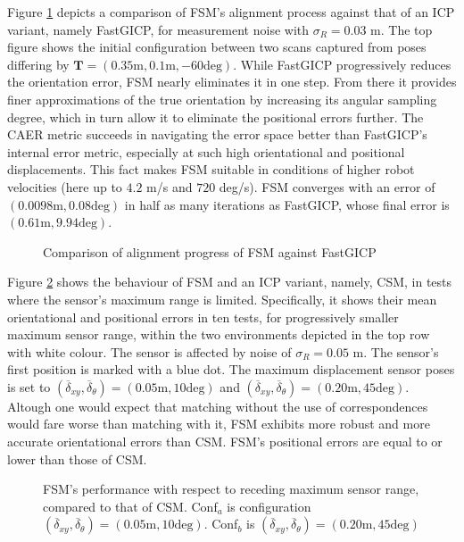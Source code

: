 Figure \ref{fig:char_fsm_vs_FGI} depicts a comparison of FSM's alignment
process against that of an ICP variant, namely FastGICP, for measurement noise
with $\sigma_R = 0.03$ m. The top figure shows the initial configuration
between two scans captured from poses differing by $\bm{T} = (0.35 \text{m},
0.1 \text{m}, -60 \text{deg})$. While FastGICP progressively reduces the
orientation error, FSM nearly eliminates it in one step. From there it provides
finer approximations of the true orientation by increasing its angular sampling
degree, which in turn allow it to eliminate the positional errors further. The
CAER metric succeeds in navigating the error space better than FastGICP's
internal error metric, especially at such high orientational and positional
displacements. This fact makes FSM suitable in conditions of higher robot
velocities (here up to $4.2$ m/s and $720$ deg/s). FSM converges with an error
of $(0.0098 \text{m}, 0.08 \text{deg})$ in half as many iterations as FastGICP,
whose final error is $(0.61 \text{m}, 9.94 \text{deg})$.

\begin{figure}
    \vspace{0.2cm}
    
    \caption{\small Comparison of alignment progress of FSM against FastGICP}%
    \label{fig:char_fsm_vs_FGI}%
\end{figure}

Figure \ref{fig:char_max_range_test} shows the behaviour of FSM and an ICP
variant, namely, CSM, in tests where the sensor's maximum range is limited.
Specifically, it shows their mean orientational and positional errors in ten
tests, for progressively smaller maximum sensor range, within the two
environments depicted in the top row with white colour. The sensor is affected
by noise of $\sigma_R = 0.05$ m. The sensor's first position is marked with a
blue dot. The maximum displacement sensor poses is set to
$(\overline{\delta}_{xy}, \overline{\delta}_{\theta}) = (0.05 \text{m}, 10 \text{deg})$
and
$(\overline{\delta}_{xy}, \overline{\delta}_{\theta}) = (0.20 \text{m}, 45 \text{deg})$.
Altough one would expect that matching without the use of correspondences would
fare worse than matching with it, FSM exhibits more robust and more accurate
orientational errors than CSM. FSM's positional errors are equal to or lower
than those of CSM.


\begin{figure}\centering
\vspace{-0.2cm}
    
    \vspace{-2.0cm}
    \caption{\small FSM's performance with respect to receding maximum sensor
             range, compared to that of CSM. Conf$_a$ is configuration
             $(\overline{\delta}_{xy}, \overline{\delta}_{\theta}) = (0.05 \text{m}, 10 \text{deg})$.
             Conf$_b$ is
             $(\overline{\delta}_{xy}, \overline{\delta}_{\theta}) = (0.20 \text{m}, 45 \text{deg})$
             }%
    \label{fig:char_max_range_test}%
\end{figure}
